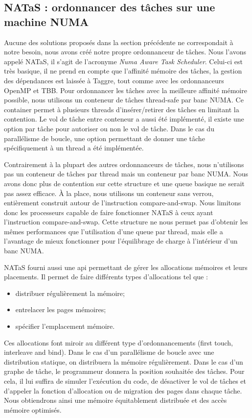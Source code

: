 \subsection{NATaS : ordonnancer des tâches sur une machine NUMA}
Aucune des solutions proposés dans la section précédente ne correspondait à notre besoin, nous avons créé notre propre ordonnanceur de tâches.
%
Nous l'avons appelé NATaS, il s'agit de l'acronyme {\em Numa Aware Task Scheduler}.
%
Celui-ci est très basique, il ne prend en compte que l'affinité mémoire des tâches, la gestion des dépendances est laissée à Taggre, tout comme avec les ordonnanceurs OpenMP et TBB.
%
Pour ordonnancer les tâches avec la meilleure affinité mémoire possible, nous utilisons un conteneur de tâches thread-safe par banc NUMA.
%
Ce container permet à plusieurs threads d'insérer/retirer des tâches en limitant la contention.
%
Le vol de tâche entre conteneur a aussi été implémenté, il existe une option par tâche pour autoriser ou non le vol de tâche.
%
Dans le cas du parallélisme de boucle, une option permettant de donner une tâche spécifiquement à un thread a été implémentée.


Contrairement à la plupart des autres ordonnanceurs de tâches, nous n'utilisons pas un conteneur de tâches par thread mais un conteneur par banc NUMA.
%
Nous avons donc plus de contention sur cette structure et une queue basique ne serait pas assez efficace.
%
\`A la place, nous utilisons un conteneur sans verrou, entièrement construit autour de l'instruction compare-and-swap.
%
Nous limitons donc les processeurs capable de faire fonctionner NATaS à ceux ayant l'instruction compare-and-swap.
%
Cette structure ne nous permet pas d'obtenir les mêmes performances que l'utilisation d'une queue par thread, mais elle a l'avantage de mieux fonctionner pour l'équilibrage de charge à l'intérieur d'un banc NUMA.



NATaS fourni aussi une api permettant de gérer les allocations mémoires et leurs placements.
%
Il permet de faire différents types d'allocations tel que :
\begin{itemize}
  \item distribuer régulièrement la mémoire;
  \item entrelacer les pages mémoires;
  \item spécifier l'emplacement mémoire.
\end{itemize}
%
Ces allocations font miroir au différent type d'ordonnancements (first touch, interleave and bind).
%
Dans le cas d'un parallélisme de boucle avec une distribution statique, on distribuera la mémoire régulièrement.
%
Dans le cas d'un graphe de tâche, le programmeur donnera la position souhaitée des tâches.
%
Pour cela, il lui suffira de simuler l'exécution du code, de désactiver le vol de tâches et d'appeler la fonction d'allocation ou de migration des pages dans chaque tâche.
%
Nous obtiendrons ainsi une mémoire équitablement distribuée et des accès mémoire optimisés.



